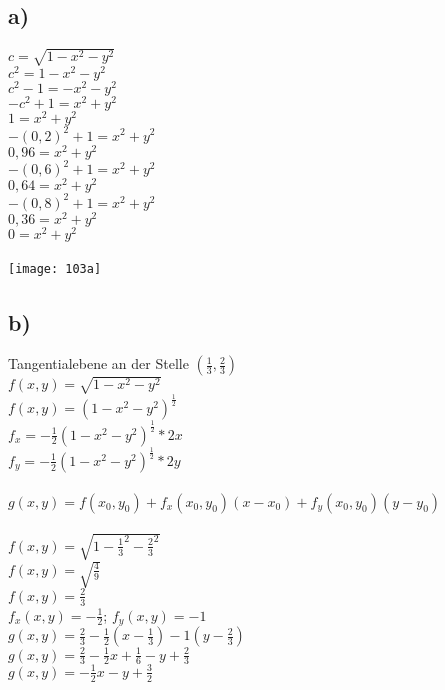 \documentclass{article}
\begin{document}
	\subsection*{a)}
	$c = \sqrt{1 - x^2 - y^2}$ \\
	$c^2 = 1 - x^2 - y^2$ \\
	$c^2 - 1 = -x^2 - y^2$ \\
	$-c^2 + 1 = x^2 + y^2$ \\
	$1 = x^2 + y^2$ \\
	$-(0,2)^2 + 1 = x^2 + y^2$ \\
	$0,96 = x^2 + y^2$ \\
	$-(0,6)^2 + 1 = x^2 + y^2$ \\
	$0,64 = x^2 + y^2$ \\
	$-(0,8)^2 + 1 = x^2 + y^2$ \\
	$0,36 = x^2 + y^2$ \\
	$0 = x^2 + y^2$ \\ \\
	\texttt{[image: 103a]}
	\subsection*{b)}
	Tangentialebene an der Stelle $(\frac{1}{3}, \frac{2}{3})$ \\
	$f(x,y) = \sqrt{1 - x^2 - y^2}$ \\
	$f(x,y) = (1 - x^2 - y^2)^{\frac{1}{2}}$ \\
	$f_x = -\frac{1}{2}(1 - x^2 - y^2)^{\frac{1}{2}}*2x$ \\
	$f_y = -\frac{1}{2}(1 - x^2 - y^2)^{\frac{1}{2}}*2y$ \\ \\
	$g(x,y) = f(x_0,y_0) + f_x(x_0,y_0)(x - x_0) + f_y(x_0,y_0)(y - y_0)$ \\ \\
	$f(x,y) = \sqrt{1 - \frac{1}{3}^2 - \frac{2}{3}^2}$ \\
	$f(x,y) = \sqrt{\frac{4}{9}}$ \\
	$f(x,y) = \frac{2}{3}$ \\
	$f_x(x,y) = -\frac{1}{2}$; $f_y(x,y) = -1$ \\
	$g(x,y) = \frac{2}{3}  -\frac{1}{2}(x - \frac{1}{3}) -1(y - \frac{2}{3})$ \\
	$g(x,y) = \frac{2}{3}  -\frac{1}{2}x + \frac{1}{6} -y + \frac{2}{3}$ \\
	$g(x,y) = -\frac{1}{2}x  -y + \frac{3}{2}$ \\
\end{document}
